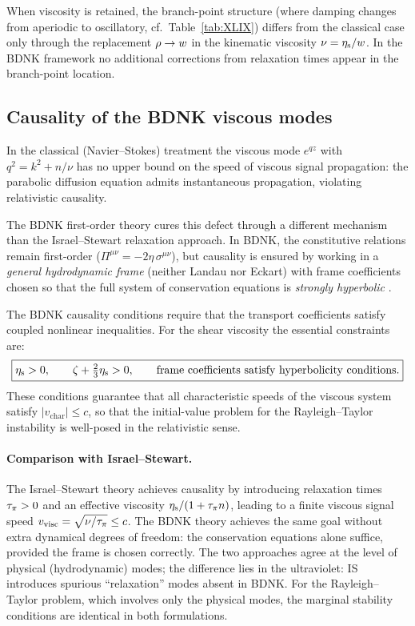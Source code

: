 When viscosity is retained, the branch-point structure (where damping
changes from aperiodic to oscillatory, cf.\ Table~\ref{tab:XLIX})
differs from the classical case only through the replacement
$\rho \to w$ in the kinematic viscosity
$\nu = \eta_{\mathrm{s}}/w$.  In the BDNK framework no additional
corrections from relaxation times appear in the branch-point
location.

\subsection{Causality of the BDNK viscous modes}
\label{sec:rel-10-94-causality}

In the classical (Navier--Stokes) treatment the viscous mode
$e^{qz}$ with $q^{2} = k^{2}+n/\nu$ has no upper bound on the
speed of viscous signal propagation: the parabolic diffusion equation
admits instantaneous propagation, violating relativistic causality.

The BDNK first-order theory cures this defect through a different
mechanism than the Israel--Stewart relaxation approach.  In BDNK,
the constitutive relations remain first-order
($\Pi^{\mu\nu} = -2\eta\,\sigma^{\mu\nu}$), but causality is
ensured by working in a \emph{general hydrodynamic frame} (neither
Landau nor Eckart) with frame coefficients chosen so that the full
system of conservation equations is \emph{strongly hyperbolic}
\citep{BemficaDN2018,Kovtun2019}.

The BDNK causality conditions require that the transport
coefficients satisfy coupled nonlinear inequalities.  For the
shear viscosity the essential constraints are:
\begin{equation}\label{eq:rel-10-BDNK-causality}
  \boxed{
  \eta_{\mathrm{s}} > 0, \qquad
  \zeta + \tfrac{2}{3}\eta_{\mathrm{s}} > 0, \qquad
  \text{frame coefficients satisfy hyperbolicity conditions.}
  }
\end{equation}
These conditions guarantee that all characteristic speeds of the
viscous system satisfy $|v_{\mathrm{char}}| \leq c$, so that the
initial-value problem for the Rayleigh--Taylor instability is
well-posed in the relativistic sense.

\paragraph{Comparison with Israel--Stewart.}
The Israel--Stewart theory achieves causality by introducing
relaxation times $\tau_{\pi} > 0$ and an effective viscosity
$\eta_{\mathrm{s}}/(1+\tau_{\pi} n)$, leading to a finite viscous signal
speed $v_{\mathrm{visc}} = \sqrt{\nu/\tau_{\pi}} \leq c$.
The BDNK theory achieves the same goal without extra dynamical
degrees of freedom: the conservation equations alone suffice,
provided the frame is chosen correctly.  The two approaches agree
at the level of physical (hydrodynamic) modes; the difference lies
in the ultraviolet: IS introduces spurious ``relaxation'' modes
absent in BDNK.  For the Rayleigh--Taylor problem, which involves
only the physical modes, the marginal stability conditions are
identical in both formulations.

